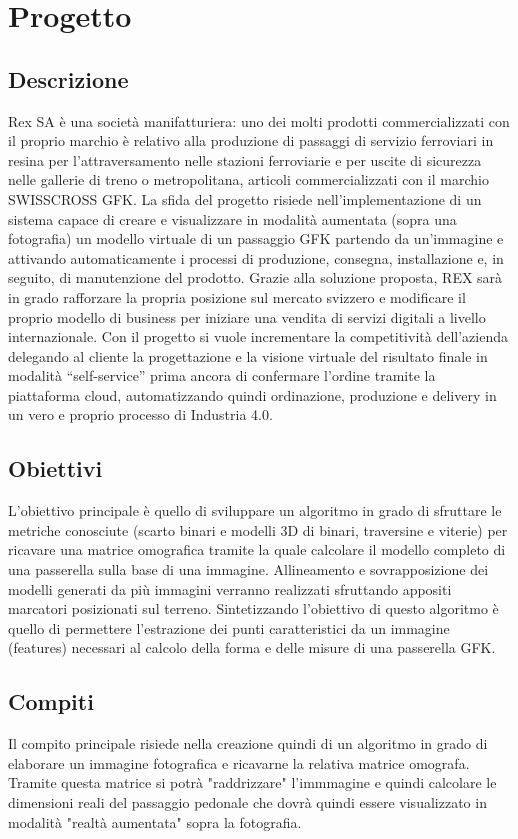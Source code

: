\documentclass[twoside]{supsistudent}
\begin{document}
\chapter{Progetto}

\section{Descrizione}
Rex SA è una società manifatturiera: uno dei molti prodotti commercializzati con il proprio marchio è relativo alla
produzione di passaggi di servizio ferroviari in resina per l’attraversamento nelle stazioni ferroviarie e per uscite di
sicurezza nelle gallerie di treno o metropolitana, articoli commercializzati con il marchio SWISSCROSS GFK.
La sfida del progetto risiede nell’implementazione di un sistema capace di creare e visualizzare in modalità aumentata
(sopra una fotografia) un modello virtuale di un passaggio GFK partendo da un'immagine e attivando automaticamente i
processi di produzione, consegna, installazione e, in seguito, di manutenzione del prodotto.
Grazie alla soluzione proposta, REX sarà in grado rafforzare la propria posizione sul mercato svizzero e modificare il
proprio modello di business per iniziare una vendita di servizi digitali a livello internazionale.
Con il progetto si vuole incrementare la competitività dell’azienda delegando al cliente la progettazione e la visione virtuale
del risultato finale in modalità “self-service” prima ancora di confermare l’ordine tramite la piattaforma cloud,
automatizzando quindi ordinazione, produzione e delivery in un vero e proprio processo di Industria 4.0.

\section{Obiettivi}
L'obiettivo principale è quello di sviluppare un algoritmo in grado di sfruttare le metriche conosciute (scarto binari e modelli
3D di binari, traversine e viterie) per ricavare una matrice omografica tramite la quale calcolare il modello completo di una passerella
sulla base di una immagine. Allineamento e sovrapposizione dei modelli generati da più immagini verranno realizzati sfruttando appositi marcatori
posizionati sul terreno. Sintetizzando l'obiettivo di questo algoritmo è quello di permettere l'estrazione dei punti caratteristici da 
un immagine (features) necessari al calcolo della forma e delle misure di una passerella GFK.

\section{Compiti}
Il compito principale risiede nella creazione quindi di un algoritmo in grado di elaborare un immagine fotografica e ricavarne la relativa matrice omografa.
Tramite questa matrice si potrà "raddrizzare" l'immmagine e quindi calcolare le dimensioni reali del passaggio pedonale
che dovrà quindi essere visualizzato in modalità "realtà aumentata" sopra la fotografia.
\end{document}
